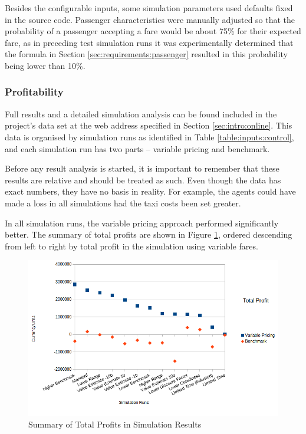 Besides the configurable inputs, some simulation parameters used defaults
fixed in the source code. Passenger characteristics were manually adjusted so
that the probability of a passenger accepting a fare would be about 75\% for
their expected fare, as in preceding test simulation runs it was experimentally
determined that the formula in Section \ref{sec:requirements:passenger}
resulted in this probability being lower than 10\%.


\subsubsection{Profitability}
\label{sec:results:profits}

Full results and a detailed simulation analysis can be found included in the
project's data set at the web address specified in Section
\ref{sec:intro:online}. This data is organised by simulation runs as identified
in Table \ref{table:inputs:control}, and each simulation run has two parts -- variable
pricing and benchmark.

Before any result analysis is started, it is important to remember that these
results are relative and should be treated as such. Even though the data has
exact numbers, they have no basis in reality. For example, the agents could
have made a loss in all simulations had the taxi costs been set greater.

In all simulation runs, the variable pricing approach performed significantly
better. The summary of total profits are shown in Figure
\ref{figure:results:total_profit}, ordered descending from left to right by
total profit in the simulation using variable fares.

\begin{figure}
\begin{center}
  \includegraphics[width=\textwidth]{../figures/total_profit}
  \caption{
    Summary of Total Profits in Simulation Results
    \label{figure:results:total_profit}
  }
\end{center}
\end{figure}


